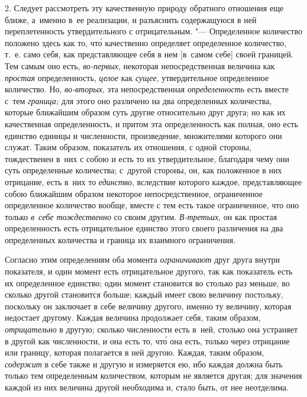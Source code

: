 2. Следует рассмотреть эту качественную природу обратного отношения еще ближе,
а~именно в~ее реализации, и разъяснить содержащуюся в ней переплетенность
утвердительного с отрицательным. "--- Определенное количество положено здесь
как то, чт\'{о} качественно определяет определенное количество, т.~е. само
себя, как представляющее себя в нем [в~самом себе] своей границей. Тем самым
оно есть, {\em во-первых}, некоторая непосредственная величина как
{\em простая} определенность, {\em целое} как {\em сущее}, утвердительное
определенное количество. Но, {\em во-вторых}, эта непосредственная
{\em определенность} есть вместе с~тем {\em граница;} для этого оно различено
на два определенных количества, которые ближайшим образом суть другие
относительно друг друга; но как их качественная определенность, и притом эта
определенность как полная, оно есть единство единицы и численности,
произведение, множителями которого они служат. Таким образом, показатель их
отношения, с одной стороны, тождественен в~них с собою и есть то их
утвердительное, благодаря чему они суть определенные количества; с~другой
стороны, он, как положенное в них отрицание, есть в~них то {\em единство},
вследствие которого каждое, представляющее собою ближайшим образом некоторое
непосредственное, ограниченное определенное количество вообще, вместе с тем
есть такое ограниченное, что оно только {\em в~себе тождественно} со своим
другим. {\em В-третьих}, он как простая определенность есть отрицательное
единство этого своего различения на два определенных количества и граница их
взаимного ограничения.

Согласно этим определениям оба момента {\em ограничивают} друг друга внутри
показателя, и один момент есть отрицательное другого, так как показатель есть
их определенное единство; один момент становится во столько раз меньше, во
сколько другой становится больше; каждый имеет свою величину постольку,
поскольку он заключает в себе величину другого, именно ту величину, которая
недостает другому. Каждая величина продолжает себя, таким образом,
{\em отрицательно} в другую; сколько численности есть в~ней, столько она
устраняет в другой как численности, и она есть то, чт\'{о} она есть, только
через отрицание или границу, которая полагается в ней другою. Каждая, таким
образом, {\em содержит} в себе также и другую и измеряется ею, ибо каждая
должна быть только тем определенным количеством, которым не является другая;
для значения каждой из них величина другой необходима и, стало быть, от нее
неотделима.

